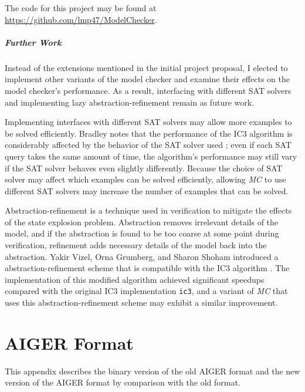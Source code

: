 \documentclass[12pt,a4paper,twoside,openright]{report}
\begin{document}
{{The code for this project may be found at \url{https://github.com/lmp47/ModelChecker}.

\paragraph{Further Work}{
Instead of the extensions mentioned in the initial project proposal,
I elected to implement other variants of the model checker and examine their
effects on the model checker's performance.
As a result, interfacing with different SAT solvers and implementing lazy
abstraction-refinement remain as future work.

Implementing interfaces with different SAT solvers may allow more examples to be solved efficiently.
Bradley notes that the performance of the IC3 algorithm is considerably affected
by the behavior of the SAT solver used \cite{bradley12}; even if each SAT query takes the same amount of
time, the algorithm's performance may still vary if the SAT solver behaves even slightly differently.
Because the choice of SAT solver may affect which examples can be solved efficiently, allowing \emph{MC}
to use different SAT solvers may increase the number of examples that can be solved.

Abstraction-refinement is a technique used in verification to mitigate the effects
of the state explosion problem. Abstraction removes irrelevant details of the model,
and if the abstraction is found to be too coarse at some point during verification,
refinement adds necessary details of the model back into the abstraction.
Yakir Vizel, Orna Grumberg, and Sharon Shoham introduced a abstraction-refinement
scheme that is compatible with the IC3 algorithm \cite{vizel12}. The implementation
of this modified algorithm achieved significant speedups compared with the
original IC3 implementation \verb,ic3,, and a variant
of \emph{MC} that uses this abstraction-refinement scheme may 
exhibit a similar improvement.}



\appendix

\chapter{AIGER Format}
\label{aiger}
This appendix describes the binary version of the old AIGER format
and the new version of the AIGER format by
comparison with the old format.

}}
\end{document}
